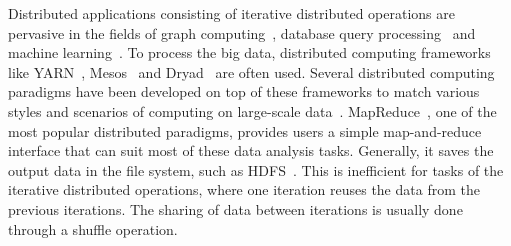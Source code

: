 \documentclass[10pt,journal,compsoc]{IEEEtran}
\begin{document}




% 
% 
% 
% 



Distributed applications consisting of iterative distributed operations are pervasive in the fields of graph computing~\cite{Malewicz:2010:PSL, Lu:2014:LDG}, database query processing~\cite{thusoo2009hive,Yu:2008:DSG,Armbrust:2015:SSR} and machine learning~\cite{low2012distributed,kraska2013mlbase}.
To process the big data,
distributed computing frameworks like YARN~\cite{vavilapalli2013apache},
Mesos~\cite{hindman2011mesos} and Dryad~\cite{isard2007dryad} are often used.
Several distributed computing paradigms have been developed on top of
these frameworks to match various styles and
scenarios of computing on large-scale data~\cite{thusoo2009hive, Yu:2008:DSG}.
MapReduce~\cite{dean2008mapreduce}, one of the most popular
distributed paradigms, provides users a simple map-and-reduce
interface that can suit most of these data analysis tasks.
Generally, it saves the output data in the file system, such as HDFS~\cite{shvachko2010hadoop}. 
This is inefficient for tasks of the iterative distributed operations, where one iteration reuses the data from the previous iterations. The sharing of data between iterations is usually done
through a shuffle operation.
\end{document}
